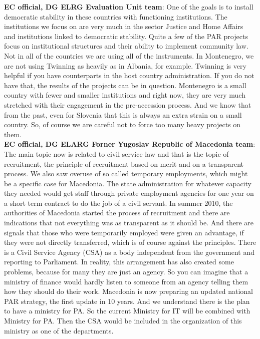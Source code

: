 \textbf{EC official, DG ELRG Evaluation Unit team}: One of the goals is to install democratic stability in these countries with functioning institutions. The institutions we focus on are very much in the sector Justice and Home Affairs and institutions linked to democratic stability. Quite a few of the PAR projects focus on institutional structures and their ability to implement community law. Not in all of the countries we are using all of the instruments. In Montenegro, we are not using Twinning as heavily as in Albania, for example. Twinning is very helpful if you have counterparts in the host country administration. If you do not have that, the results of the projects can be in question. Montenegro is a small country with fewer and smaller institutions and right now, they are very much stretched with their engagement in the pre-accession process. And we know that from the past, even for Slovenia that this is always an extra strain on a small country. So, of course we are careful not to force too many heavy projects on them. \\
\textbf{EC official, DG ELARG Forner Yugoslav Republic of Macedonia team}: The main topic now is related to civil service law and that is the topic of recruitment, the principle of recruitment based on merit and on a transparent process. We also saw overuse of so called temporary employments, which might be a specific case for Macedonia. The state administration for whatever capacity they needed would get staff through private employment agencies for one year on a short term contract to do the job of a civil servant. In summer 2010, the authorities of Macedonia started the process of recruitment and there are indications that not everything was as transparent as it should be. And there are signals that those who were temporarily employed were given an advantage, if they were not directly transferred, which is of course against the principles. There is a Civil Service Agency (CSA) as a body independent from the government and reporting to Parliament. In reality, this arrangement has also created some problems, because for many they are just an agency. So you can imagine that a ministry of finance would hardly listen to someone from an agency telling them how they should do their work. Macedonia is now preparing an updated national PAR strategy, the first update in 10 years. And we understand there is the plan to have a ministry for PA. So the current Ministry for IT will be combined with Ministry for PA. Then the CSA would be included in the organization of this ministry as one of the departments. \\
